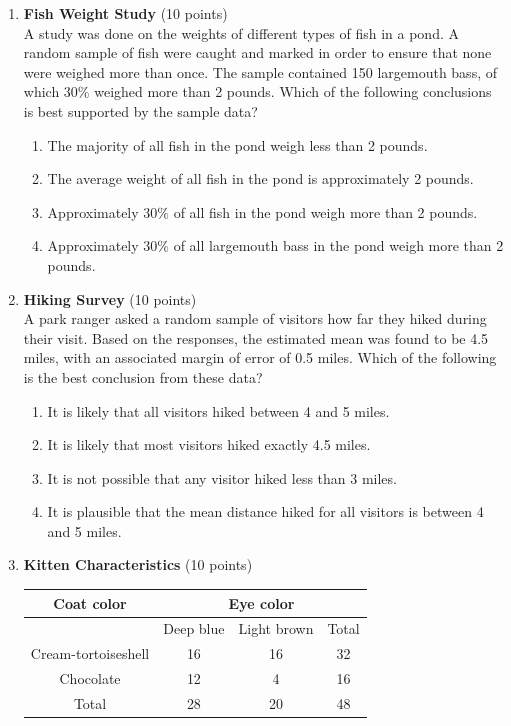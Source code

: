 \begin{enumerate}
  \item \textbf{Fish Weight Study} (10 points)\\
  A study was done on the weights of different types of fish in a pond. A random sample of fish were caught and marked in order to ensure that none were weighed more than once. The sample contained 150 largemouth bass, of which $30\%$ weighed more than 2 pounds. Which of the following conclusions is best supported by the sample data?
  \begin{enumerate}[label=(\Alph*)]
    \item The majority of all fish in the pond weigh less than 2 pounds.
    \item The average weight of all fish in the pond is approximately 2 pounds.
    \item Approximately $30\%$ of all fish in the pond weigh more than 2 pounds.
    \item Approximately $30\%$ of all largemouth bass in the pond weigh more than 2 pounds.
  \end{enumerate}
  \begin{subanswer}
  \end{subanswer}

  \item \textbf{Hiking Survey} (10 points)\\
  A park ranger asked a random sample of visitors how far they hiked during their visit. Based on the responses, the estimated mean was found to be 4.5 miles, with an associated margin of error of 0.5 miles. Which of the following is the best conclusion from these data?
  \begin{enumerate}[label=(\Alph*)]
    \item It is likely that all visitors hiked between 4 and 5 miles.
    \item It is likely that most visitors hiked exactly 4.5 miles.
    \item It is not possible that any visitor hiked less than 3 miles.
    \item It is plausible that the mean distance hiked for all visitors is between 4 and 5 miles.
  \end{enumerate}
  \begin{subanswer}
  \end{subanswer}

  \newpage

  \item \textbf{Kitten Characteristics} (10 points)\\
  \begin{center}
  \begin{tabular}{|c|c|c|c|}
  \hline
  Coat color & \multicolumn{3}{|c|}{Eye color} \\
  \hline
  & Deep blue & Light brown & Total \\
  \hline
  Cream-tortoiseshell & 16 & 16 & 32 \\
  \hline
  Chocolate & 12 & 4 & 16 \\
  \hline
  Total & 28 & 20 & 48 \\
  \hline
  \end{tabular}
  \end{center}


\end{enumerate}

